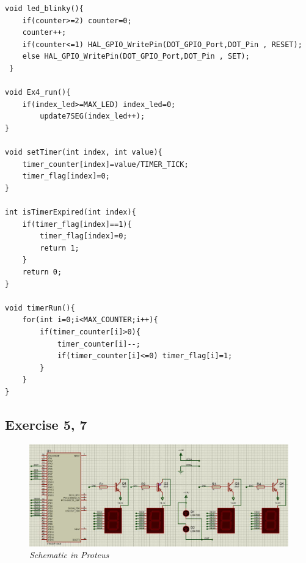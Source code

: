 \begin{lstlisting}[caption=software$\_$timer4.c]
void led_blinky(){
 	if(counter>=2) counter=0;
 	counter++;
 	if(counter<=1) HAL_GPIO_WritePin(DOT_GPIO_Port,DOT_Pin , RESET);
 	else HAL_GPIO_WritePin(DOT_GPIO_Port,DOT_Pin , SET);
 }
 
void Ex4_run(){
	if(index_led>=MAX_LED) index_led=0;
		update7SEG(index_led++);
}

void setTimer(int index, int value){
	timer_counter[index]=value/TIMER_TICK;
	timer_flag[index]=0;
}

int isTimerExpired(int index){
	if(timer_flag[index]==1){
		timer_flag[index]=0;
		return 1;
	}
	return 0;
}

void timerRun(){
	for(int i=0;i<MAX_COUNTER;i++){
		if(timer_counter[i]>0){
			timer_counter[i]--;
			if(timer_counter[i]<=0) timer_flag[i]=1;
		}
	}
}
\end{lstlisting}
\newpage
\subsection{Exercise 5, 7}
\begin{figure}[!htp]
    \centering
    \includegraphics[width=5.5in]{source/picture/bai_2/pic5.jpg}
    \caption{\textit{ Schematic in Proteus}}
    \label{bai2_pic1a}
\end{figure}

